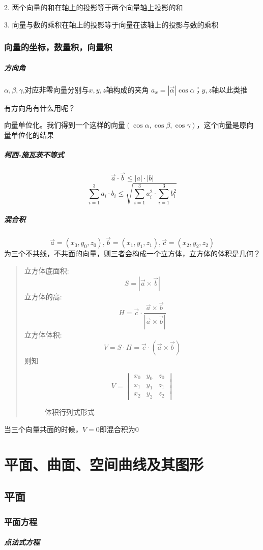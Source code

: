 \documentclass[UTF8]{ctexart}
\begin{document}
    2. 两个向量的和在轴上的投影等于两个向量轴上投影的和
    
    3. 向量与数的乘积在轴上的投影等于向量在该轴上的投影与数的乘积
\subsubsection{向量的坐标，数量积，向量积}
    \subparagraph{方向角}$\alpha,\beta,\gamma$,对应非零向量分别与$x,y,z$轴构成的夹角
    $a_x = |\vec\alpha|\cos\alpha$；$y,z$轴以此类推

    有方向角有什么用呢？

    向量单位化。我们得到一个这样的向量$(\cos\alpha,\cos\beta,\cos\gamma)$，这个向量是原向量单位化的结果

    \subparagraph{柯西-施瓦茨不等式}
   $$\vec a\cdot\vec b \le |a|\cdot|b|$$   
   $$\sum_{i=1}^3 a_i\cdot b_i \le \sqrt{\sum_{i=1}^3 a_i^2\cdot\sum_{i=1}^3 b_i^2}$$
    \subparagraph{混合积}
    $$\vec a=(x_0,y_0,z_0),\vec b=(x_1,y_1,z_1),\vec c=(x_2,y_2,z_2)$$为三个不共线，不共面的向量，则三者会构成一个立方体，立方体的体积是几何？
    \begin{quote}
      立方体底面积:
      $$S=|\vec a \times \vec b|$$
      立方体的高:
      $$H = \vec c \cdot \frac{\vec a \times \vec b}{|\vec a \times \vec b|}$$
      立方体体积:
      $$V = S \cdot H = \vec c \cdot (\vec a \times \vec b)$$
      则知
      \begin{figure}[h]
      $$
        V = 
        \begin{vmatrix}
          x_0 & y_0 & z_0 \\
          x_1 & y_1 & z_1 \\
          x_2 & y_2 & z_2
        \end{vmatrix}
      $$  
        \caption{体积行列式形式}
        \label{体积行列式形式}
      \end{figure}
    \end{quote}
    当三个向量共面的时候，$V=0$即混合积为0
\section{平面、曲面、空间曲线及其图形}

\subsection{平面}
\subsubsection{平面方程}
\subparagraph{点法式方程}
\end{document}
